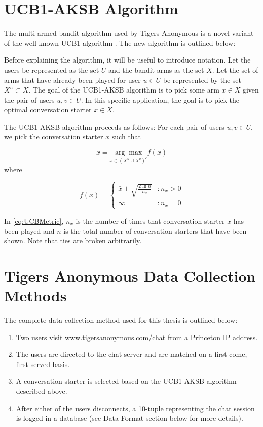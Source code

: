 \section{UCB1-AKSB Algorithm}

The multi-armed bandit algorithm used by Tigers Anonymous is a novel variant of the well-known UCB1 algorithm \citep{auer02}. The new algorithm is outlined below:

Before explaining the algorithm, it will be useful to introduce notation. Let the users be represented as the set $U$ and the bandit arms as the set $X$. Let the set of arms that have already been played for user $u\in{U}$ be represented by the set $X^u \subset{X}$. The goal of the UCB1-AKSB algorithm is to pick some arm $x\in{X}$ given the pair of users $u,v \in{U}$. In this specific application, the goal is to pick the optimal conversation starter $x\in{X}$.

The UCB1-AKSB algorithm proceeds as follows: For each pair of users $u,v\in{U}$, we pick the conversation starter $x$ such that

\begin{equation}
\label{eq:UCBMain}
x = \underset{x \in{(X^u \cup X^v)}^{\mathsf{c}}}{\arg\max{}} f(x)
\end{equation}
where

\begin{equation}
\label{eq:UCBMetric}
   f(x) = \left\{
     \begin{array}{lr}
       \bar{x}+ \sqrt{\frac{2\ln{n}}{n_x}} & : n_x > 0\\
       \infty & : n_x = 0
     \end{array}
   \right.
\end{equation}

In \ref{eq:UCBMetric}, $n_x$ is the number of times that conversation starter $x$ has been played and $n$ is the total number of conversation starters that have been shown. Note that ties are broken arbitrarily.

\section{Tigers Anonymous Data Collection Methods}

The complete data-collection method used for this thesis is outlined below: 

\begin{enumerate}
\item Two users visit www.tigersanonymous.com/chat from a Princeton IP address.
\item The users are directed to the chat server and are matched on a first-come, first-served basis.
\item A conversation starter is selected based on the UCB1-AKSB algorithm described above.
\item After either of the users disconnects, a 10-tuple representing the chat session is logged in a database (see Data Format section below for more details).
\end{enumerate}


